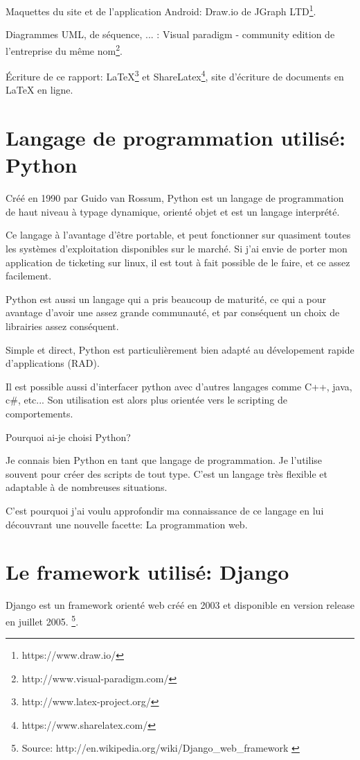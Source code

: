 \documentclass[12pt,table,a4paper]{report}
\begin{document}
Maquettes du site et de l'application Android: Draw.io de JGraph LTD\footnote{https://www.draw.io/}.

Diagrammes UML, de séquence, ... : Visual paradigm - community edition de l'entreprise du même nom\footnote{http://www.visual-paradigm.com/}.

Écriture de ce rapport: LaTeX\footnote{http://www.latex-project.org/} et ShareLatex\footnote{https://www.sharelatex.com/}, site d'écriture de documents en LaTeX en ligne.

\section{Langage de programmation utilisé: Python}
Créé en 1990 par Guido van Rossum, Python est un langage de programmation de haut niveau à typage dynamique, orienté objet et est un langage interprété.

Ce langage à l'avantage d'être portable, et peut fonctionner sur quasiment toutes les systèmes d'exploitation disponibles sur le marché. Si j'ai envie de porter mon application de ticketing sur linux, il est tout à fait possible de le faire, et ce assez facilement.

Python est aussi un langage qui a pris beaucoup de maturité, ce qui a pour avantage d'avoir une assez grande communauté, et par conséquent un choix de librairies assez conséquent.

Simple et direct, Python est particulièrement bien adapté au dévelopement rapide d'applications (RAD).

Il est possible aussi d'interfacer python avec d'autres langages comme C++, java, c\#, etc... Son utilisation est alors plus orientée vers le scripting de comportements.

\begin{center}
Pourquoi ai-je choisi Python? 
\end{center}

Je connais bien Python en tant que langage de programmation. Je l'utilise souvent pour créer des scripts de tout type. C'est un langage très flexible et adaptable à de nombreuses situations.

C'est pourquoi j'ai voulu approfondir ma connaissance de ce langage en lui découvrant une nouvelle facette: La programmation web.

\section{Le framework utilisé: Django}
Django est un framework orienté web créé en 2003 et disponible en version release en juillet 2005. \footnote{Source: http://en.wikipedia.org/wiki/Django\_web\_framework \label{DjangoWikipediaArticle}}.
\end{document}
